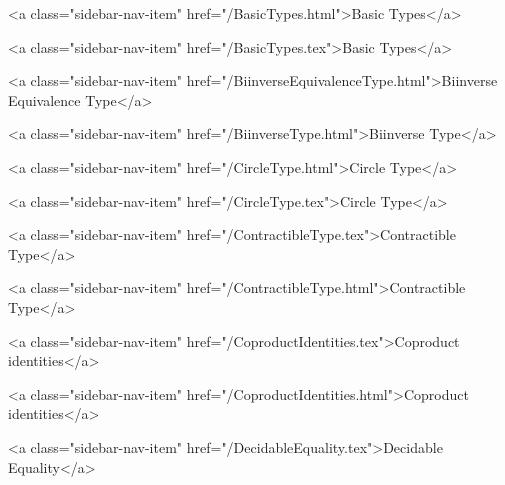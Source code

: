       
        
          <a class="sidebar-nav-item" href="/BasicTypes.html">Basic Types</a>
        
      
    
      
        
          <a class="sidebar-nav-item" href="/BasicTypes.tex">Basic Types</a>
        
      
    
      
        
          <a class="sidebar-nav-item" href="/BiinverseEquivalenceType.html">Biinverse Equivalence Type</a>
        
      
    
      
        
          <a class="sidebar-nav-item" href="/BiinverseType.html">Biinverse Type</a>
        
      
    
      
        
          <a class="sidebar-nav-item" href="/CircleType.html">Circle Type</a>
        
      
    
      
        
          <a class="sidebar-nav-item" href="/CircleType.tex">Circle Type</a>
        
      
    
      
        
          <a class="sidebar-nav-item" href="/ContractibleType.tex">Contractible Type</a>
        
      
    
      
        
          <a class="sidebar-nav-item" href="/ContractibleType.html">Contractible Type</a>
        
      
    
      
        
          <a class="sidebar-nav-item" href="/CoproductIdentities.tex">Coproduct identities</a>
        
      
    
      
        
          <a class="sidebar-nav-item" href="/CoproductIdentities.html">Coproduct identities</a>
        
      
    
      
        
          <a class="sidebar-nav-item" href="/DecidableEquality.tex">Decidable Equality</a>
        
